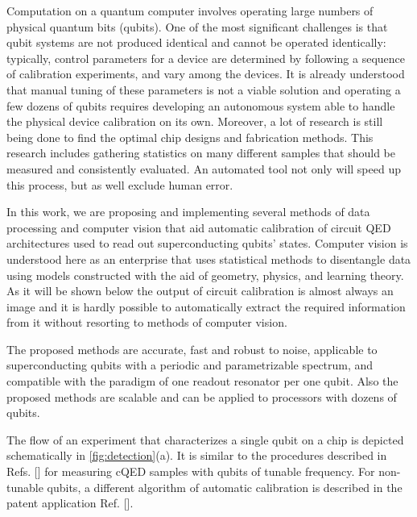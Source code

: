 \documentclass[%
 aip,
 draft,
 amsmath,amssymb,
 reprint,%
]{revtex4-1}
\begin{document}
Computation on a quantum computer involves operating large numbers of physical quantum bits (qubits). One of the most significant challenges is that qubit systems are not produced identical and cannot be operated identically\cite{kelly2018, chen2018}: typically, control parameters for a device are determined by following a sequence of calibration experiments, and vary among the devices. It is already understood that manual tuning of these parameters is not a viable solution and operating a few dozens of qubits requires developing an autonomous system able to handle the physical device calibration on its own. Moreover, a lot of research is still being done to find the optimal chip designs and fabrication methods. This research includes gathering statistics on many different samples that should be measured and consistently evaluated. An automated tool not only will speed up this process, but as well exclude human error.

In this work, we are proposing and implementing several methods of data processing and computer vision that aid automatic calibration of circuit QED\cite{blais2007} architectures used to read out superconducting qubits' states. Computer vision is understood here as an enterprise that uses statistical methods to disentangle data using models constructed with the aid of geometry, physics, and learning theory\cite{forsyth2011}. As it will be shown below the output of circuit calibration is almost always an image and it is hardly possible to automatically extract the required information from it without resorting to methods of computer vision.

The proposed methods are accurate, fast and robust to noise, applicable to superconducting qubits with a periodic and parametrizable spectrum, and compatible with the paradigm of one readout resonator per one qubit\cite{versluis2017, kelly2015}. Also the proposed methods are scalable and can be applied to processors with dozens of qubits.

The flow of an experiment that characterizes a single qubit on a chip is depicted schematically in \autoref{fig:detection}(a). It is similar to the  procedures described in Refs. [] for measuring cQED samples with qubits of tunable frequency. For non-tunable qubits, a different algorithm of automatic calibration is described in the patent application Ref. [].
\end{document}
